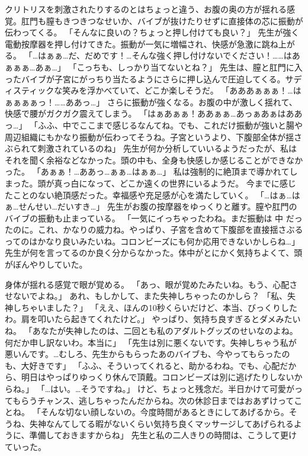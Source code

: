 クリトリスを刺激されたりするのとはちょっと違う、お腹の奥の方が揺れる感覚。肛門も膣もきつきつなせいか、バイブが抜けたりせずに直接体の芯に振動が伝わってくる。
「そんなに良いの？ちょっと押し付けても良い？」
先生が強く電動按摩器を押し付けてきた。振動が一気に増幅され、快感が急激に跳ね上がる。
「…はぁぁ…だ、だめです！…そんな強く押し付けないでください！……はあぁぁぁ…あぁ…」
「こっちも、しっかり当てないとね？」
先生は、膣と肛門に入ったバイブが子宮にがっちり当たるようにさらに押し込んで圧迫してくる。サディスティックな笑みを浮かべていて、どこか楽しそうだ。
「あああぁぁぁ！…はぁぁぁぁっ！……ああっ…」
さらに振動が強くなる。お腹の中が激しく揺れて、快感で腰がガクガク震えてしまう。
「はぁあぁぁ！ああぁぁ…あっぁあぁはああっ…」
「ふふ、中でここまで感じるなんてね。でも、これだけ振動が強いと腸や周辺組織にもかなり振動が伝わってそうね。子宮というより、下腹部全体が揺さぶられて刺激されているのね」
先生が何か分析していいるようだったが、私はそれを聞く余裕などなかった。頭の中も、全身も快感しか感じることができなかった。
「あぁぁ！…ああっ…ぁぁ…はぁぁ…」
私は強制的に絶頂まで導かれてしまった。頭が真っ白になって、どこか遠くの世界にいるようだ。
今までに感じたことのない絶頂感だった。幸福感や充足感が心を満たしていく。
「…はぁ…はぁ…せんせい…だいすき…」
先生がお腹の按摩器をゆっくりと離す。膣や肛門のバイブの振動も止まっている。
「一気にイっちゃったわね。まだ振動は 中 だったのに。これ、かなりの威力ね。やっぱり、子宮を含めて下腹部を直接揺さぶるってのはかなり良いみたいね。コロンビーズにも何か応用できないかしらね…」
先生が何を言ってるのか良く分からなかった。体中がとにかく気持ちよくて、頭がぼんやりしていた。

身体が揺れる感覚で眼が覚める。
「あっ、眼が覚めたみたいね。もう、心配させないでよね。」
あれ、もしかして、また失神しちゃったのかしら？
「私、失神しちゃいました？」
「ええ、ほんの10秒くらいだけど、本当、びっくりしたわ。肩を叩いたら起きてくれたけど。」
やっぱり、気持ち良すぎるとダメみたいね。
「あなたが失神したのは、二回とも私のアダルトグッズのせいなのよね。何だか申し訳ないわ。本当に」
「先生は別に悪くないです。失神しちゃう私が悪いんです。…むしろ、先生からもらったあのバイブも、今やってもらったのも、大好きです」
「ふふ、そういってくれると、助かるわね。でも、心配だから、明日はやっぱりゆっくり休んで頂戴。コロンビーズは別に逃げたりしないからね。」
「…はい。…そうですね。」
けど、ちょっと残念だ。半日かけて可愛がってもらうチャンス、逃しちゃったんだからね。次の休診日まではおあずけってことね。
「そんな切ない顔しないの。今度時間があるときにしてあげるから。そうね、失神なんてしてる暇がないくらい気持ち良くマッサージしてあげられるように、準備しておきますからね」
先生と私の二人きりの時間は、こうして更けていった。


